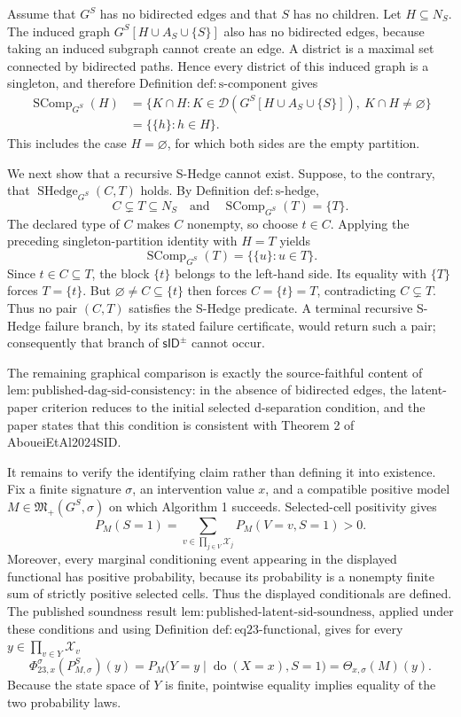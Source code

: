 Assume that \(G^S\) has no bidirected edges and that \(S\) has no children.  Let \(H\subseteq N_S\).  The induced graph \(G^S[H\cup A_S\cup\{S\}]\) also has no bidirected edges, because taking an induced subgraph cannot create an edge.  A district is a maximal set connected by bidirected paths.  Hence every district of this induced graph is a singleton, and therefore Definition \(\mathrm{def:s\text{-}component}\) gives
\[
\begin{aligned}
 \operatorname{SComp}_{G^S}(H)
 &=\bigl\{K\cap H:K\in\mathcal D(G^S[H\cup A_S\cup\{S\}]),\ K\cap H\ne\varnothing\bigr\}\\
 &=\bigl\{\{h\}:h\in H\bigr\}.
\end{aligned}
\]
This includes the case \(H=\varnothing\), for which both sides are the empty partition.

We next show that a recursive S-Hedge cannot exist.  Suppose, to the contrary, that \(\operatorname{SHedge}_{G^S}(C,T)\) holds.  By Definition \(\mathrm{def:s\text{-}hedge}\),
\[
 C\subsetneq T\subseteq N_S
 \quad\text{and}\quad
 \operatorname{SComp}_{G^S}(T)=\{T\}.
\]
The declared type of \(C\) makes \(C\) nonempty, so choose \(t\in C\).  Applying the preceding singleton-partition identity with \(H=T\) yields
\[
 \operatorname{SComp}_{G^S}(T)=\bigl\{\{u\}:u\in T\bigr\}.
\]
Since \(t\in C\subseteq T\), the block \(\{t\}\) belongs to the left-hand side.  Its equality with \(\{T\}\) forces \(T=\{t\}\).  But \(\varnothing\ne C\subseteq\{t\}\) then forces \(C=\{t\}=T\), contradicting \(C\subsetneq T\).  Thus no pair \((C,T)\) satisfies the S-Hedge predicate.  A terminal recursive S-Hedge failure branch, by its stated failure certificate, would return such a pair; consequently that branch of \(\mathsf{sID}^{\pm}\) cannot occur.

The remaining graphical comparison is exactly the source-faithful content of \(\mathrm{lem:published\text{-}dag\text{-}sid\text{-}consistency}\): in the absence of bidirected edges, the latent-paper criterion reduces to the initial selected d-separation condition, and the paper states that this condition is consistent with Theorem 2 of AboueiEtAl2024SID.

It remains to verify the identifying claim rather than defining it into existence.  Fix a finite signature \(\sigma\), an intervention value \(x\), and a compatible positive model \(M\in\mathfrak M_+(G^S,\sigma)\) on which Algorithm 1 succeeds.  Selected-cell positivity gives
\[
 P_M(S=1)=\sum_{v\in\prod_{j\in V}\mathcal X_j}P_M(V=v,S=1)>0.
\]
Moreover, every marginal conditioning event appearing in the displayed functional has positive probability, because its probability is a nonempty finite sum of strictly positive selected cells.  Thus the displayed conditionals are defined.  The published soundness result \(\mathrm{lem:published\text{-}latent\text{-}sid\text{-}soundness}\), applied under these conditions and using Definition \(\mathrm{def:eq23\text{-}functional}\), gives for every \(y\in\prod_{v\in Y}\mathcal X_v\)
\[
 \Phi_{23,x}^{\sigma}(P_{M,\sigma}^S)(y)
 =P_M\bigl(Y=y\mid\operatorname{do}(X=x),S=1\bigr)
 =\Theta_{x,\sigma}(M)(y).
\]
Because the state space of \(Y\) is finite, pointwise equality implies equality of the two probability laws.

